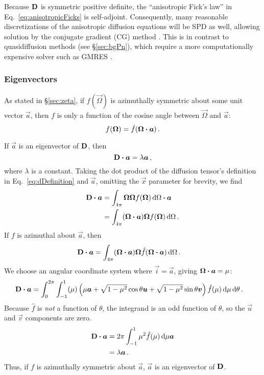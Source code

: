 Because $\mathbf{D}$ is symmetric positive definite, the ``anisotropic Fick's law''
in Eq.~\eqref{eq:anisotropicFicks} is self-adjoint.  Consequently, many
reasonable discretizations of the anisotropic diffusion equations will be SPD as
well, allowing solution by the conjugate gradient (CG) method \cite{Tre1997}.
This is in contrast to quasidiffusion methods (see \S\ref{sec:bgPn}), which
require a more computationally expensive solver such as GMRES \cite{War2003}.

\subsubsection{Eigenvectors}\label{sec:eigenvectors}
As stated in \S\ref{sec:zeta}, if $f(\vec{\Omega})$ is azimuthally
symmetric about some unit vector $\vec{a}$, then $f$ is only a function of the
cosine angle
between $\vec{\Omega}$ and $\vec{a}$:
\begin{equation*}
f(\bm{\Omega}) = \hat f( \bm{\Omega} \bm{\cdot} \bm{a})\,.
\end{equation*}

If $\vec{a}$ is an eigenvector of $\mathbf{D}$, then
\begin{equation*}
  \mathbf{D} \bm{\cdot} \bm{a} = \lambda \bm{a}\,,
\end{equation*}
where $\lambda$ is a constant. Taking the dot product of the diffusion tensor's
definition in Eq.~\eqref{eq:dDefinition} and
$\vec{a}$, omitting the $\vec{x}$ parameter for brevity, we find
\begin{align*}
  \mathbf{D} \bm{\cdot} \bm{a}
  &= \int_{4\pi} \bm{\Omega} \bm{\Omega} f(\bm{\Omega}) \mathop{}\!\mathrm{d}\Omega \bm{\cdot} \bm{a}
  \\
  &= \int_{4\pi} (\bm{\Omega} \bm{\cdot} \bm{a}) \bm{\Omega} f(\bm{\Omega}) \mathop{}\!\mathrm{d}\Omega
  \,.
\end{align*}
If $f$ is azimuthal about $\vec{a}$, then
\begin{align*}
  \mathbf{D} \bm{\cdot} \bm{a}
  &= \int_{4\pi} (\bm{\Omega} \bm{\cdot} \bm{a}) \bm{\Omega}
    \hat f(\bm{\Omega} \bm{\cdot} \bm{a}) \mathop{}\!\mathrm{d}\Omega \,.
\end{align*}
We choose an angular coordinate system where $\vec{i}=\vec{a}$, giving
$\bm{\Omega} \bm{\cdot} \bm{a}=\mu$:
\begin{align*}
  \mathbf{D} \bm{\cdot} \bm{a}
  &= \int_{0}^{2\pi} \int_{-1}^{1} (\mu)
  \left( \mu \bm{a} + \sqrt{1-\mu^2} \cos \theta \bm{u} + \sqrt{1-\mu^2} \sin
  \theta \bm{v} \right) \hat f(\mu) \mathop{}\!\mathrm{d}\mu \mathop{}\!\mathrm{d}\theta \,.
\end{align*}
Because $\hat f$ is \emph{not} a function of $\theta$, the integrand is an
odd function of $\theta$, so the $\vec{u}$ and $\vec{v}$ components are zero.
\begin{align*}
  \mathbf{D} \bm{\cdot} \bm{a}
  &= 2\pi \int_{-1}^{1} \mu^2 \hat f(\mu) \mathop{}\!\mathrm{d}\mu \bm{a}
  \\
  &= \lambda \bm{a} \,.
\end{align*}
Thus, if $f$ is azimuthally symmetric about $\vec{a}$, $\vec{a}$ is an
eigenvector of $\mathbf{D}$.

